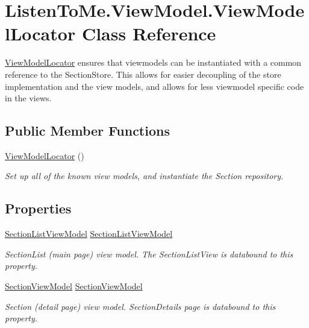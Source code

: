 \hypertarget{class_listen_to_me_1_1_view_model_1_1_view_model_locator}{}\section{Listen\+To\+Me.\+View\+Model.\+View\+Model\+Locator Class Reference}
\label{class_listen_to_me_1_1_view_model_1_1_view_model_locator}


\mbox{\hyperlink{class_listen_to_me_1_1_view_model_1_1_view_model_locator}{View\+Model\+Locator}} ensures that viewmodels can be instantiated with a common reference to the Section\+Store. This allows for easier decoupling of the store implementation and the view models, and allows for less viewmodel specific code in the views.  


\subsection*{Public Member Functions}
\begin{DoxyCompactItemize}
\item 
\mbox{\hyperlink{class_listen_to_me_1_1_view_model_1_1_view_model_locator_a50210a77a76da746801409d1787c1660}{View\+Model\+Locator}} ()
\begin{DoxyCompactList}\small\item\em Set up all of the known view models, and instantiate the Section repository. \end{DoxyCompactList}\end{DoxyCompactItemize}
\subsection*{Properties}
\begin{DoxyCompactItemize}
\item 
\mbox{\hyperlink{class_listen_to_me_1_1_view_model_1_1_section_list_view_model}{Section\+List\+View\+Model}} \mbox{\hyperlink{class_listen_to_me_1_1_view_model_1_1_view_model_locator_afc24088b98a0ad7f3b8e7f1afd70b80f}{Section\+List\+View\+Model}}
\begin{DoxyCompactList}\small\item\em Section\+List (main page) view model. The Section\+List\+View is databound to this property. \end{DoxyCompactList}\item 
\mbox{\hyperlink{class_listen_to_me_1_1_view_model_1_1_section_view_model}{Section\+View\+Model}} \mbox{\hyperlink{class_listen_to_me_1_1_view_model_1_1_view_model_locator_ac631670f442882ee7070273fb72d48d1}{Section\+View\+Model}}
\begin{DoxyCompactList}\small\item\em Section (detail page) view model. Section\+Details page is databound to this property. \end{DoxyCompactList}\end{DoxyCompactItemize}
